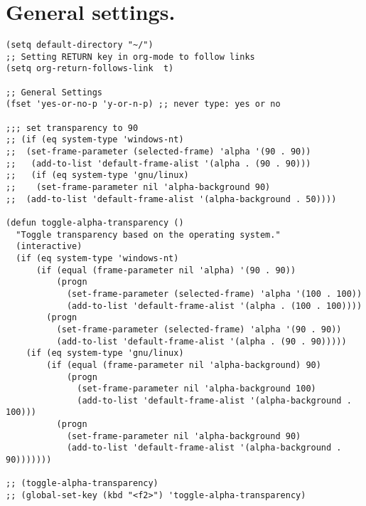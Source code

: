 \documentclass[11pt]{article}
\begin{document}
\section{General settings.}
\label{sec:orgec65004}
\begin{verbatim}
(setq default-directory "~/")
;; Setting RETURN key in org-mode to follow links
(setq org-return-follows-link  t)

;; General Settings
(fset 'yes-or-no-p 'y-or-n-p) ;; never type: yes or no

;;; set transparency to 90
;; (if (eq system-type 'windows-nt)
;; 	(set-frame-parameter (selected-frame) 'alpha '(90 . 90))
;;   (add-to-list 'default-frame-alist '(alpha . (90 . 90)))
;;   (if (eq system-type 'gnu/linux)
;; 	  (set-frame-parameter nil 'alpha-background 90)
;; 	(add-to-list 'default-frame-alist '(alpha-background . 50))))

(defun toggle-alpha-transparency ()
  "Toggle transparency based on the operating system."
  (interactive)
  (if (eq system-type 'windows-nt)
      (if (equal (frame-parameter nil 'alpha) '(90 . 90))
          (progn
            (set-frame-parameter (selected-frame) 'alpha '(100 . 100))
            (add-to-list 'default-frame-alist '(alpha . (100 . 100))))
        (progn
          (set-frame-parameter (selected-frame) 'alpha '(90 . 90))
          (add-to-list 'default-frame-alist '(alpha . (90 . 90)))))
    (if (eq system-type 'gnu/linux)
        (if (equal (frame-parameter nil 'alpha-background) 90)
            (progn
              (set-frame-parameter nil 'alpha-background 100)
              (add-to-list 'default-frame-alist '(alpha-background . 100)))
          (progn
            (set-frame-parameter nil 'alpha-background 90)
            (add-to-list 'default-frame-alist '(alpha-background . 90)))))))

;; (toggle-alpha-transparency)
;; (global-set-key (kbd "<f2>") 'toggle-alpha-transparency)


\end{verbatim}
\end{document}
